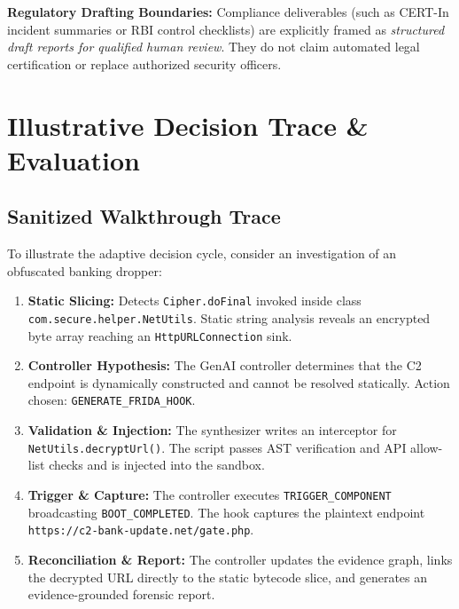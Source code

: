 \documentclass[conference]{IEEEtran}
\begin{document}
\textbf{Regulatory Drafting Boundaries:} Compliance deliverables (such as CERT-In incident summaries or RBI control checklists) are explicitly framed as \textit{structured draft reports for qualified human review}. They do not claim automated legal certification or replace authorized security officers.

\section{Illustrative Decision Trace \& Evaluation}

\subsection{Sanitized Walkthrough Trace}
To illustrate the adaptive decision cycle, consider an investigation of an obfuscated banking dropper:
\begin{enumerate}
    \item \textbf{Static Slicing:} Detects \texttt{Cipher.doFinal} invoked inside class \texttt{com.secure.helper.NetUtils}. Static string analysis reveals an encrypted byte array reaching an \texttt{HttpURLConnection} sink.
    \item \textbf{Controller Hypothesis:} The GenAI controller determines that the C2 endpoint is dynamically constructed and cannot be resolved statically. Action chosen: \texttt{GENERATE\_FRIDA\_HOOK}.
    \item \textbf{Validation \& Injection:} The synthesizer writes an interceptor for \texttt{NetUtils.decryptUrl()}. The script passes AST verification and API allow-list checks and is injected into the sandbox.
    \item \textbf{Trigger \& Capture:} The controller executes \texttt{TRIGGER\_COMPONENT} broadcasting \texttt{BOOT\_COMPLETED}. The hook captures the plaintext endpoint \texttt{https://c2-bank-update.net/gate.php}.
    \item \textbf{Reconciliation \& Report:} The controller updates the evidence graph, links the decrypted URL directly to the static bytecode slice, and generates an evidence-grounded forensic report.
\end{enumerate}
\end{document}
